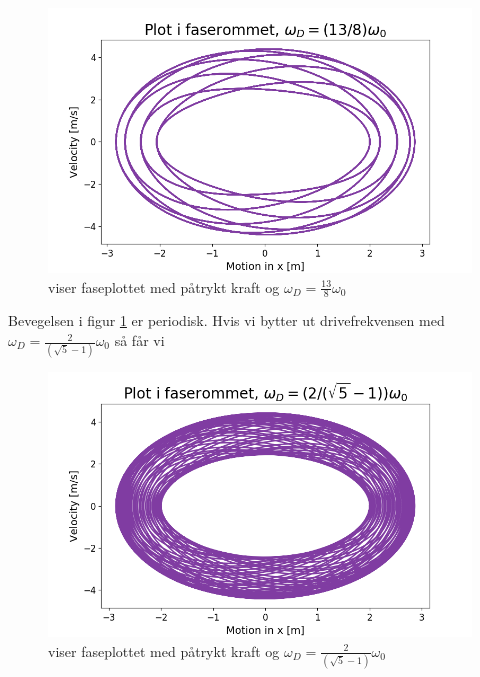 \documentclass[norsk,a4paper,12pt]{article}
\begin{document}
\begin{figure}[H]
\begin{center}
\includegraphics[scale=0.5]{Oppgave4fasedel1.png}
\caption{viser faseplottet med påtrykt kraft og $\omega_D = \frac{13}{8}\omega_0$}
\label{fig:faseplot4del1}
\end{center}
\end{figure}
Bevegelsen i figur \ref{fig:faseplot4del1} er periodisk. Hvis vi bytter ut drivefrekvensen med $\omega_D = \frac{2}{\left(\sqrt{5}-1 \right)}\omega_0$ så får vi 


\begin{figure}[H]
\begin{center}
\includegraphics[scale=0.5]{Oppgave4fasedel2.png}
\caption{viser faseplottet med påtrykt kraft og $\omega_D = \frac{2}{\left(\sqrt{5}-1 \right)}\omega_0$}
\label{fig:faseplot4del2}
\end{center}
\end{figure}
\end{document}
